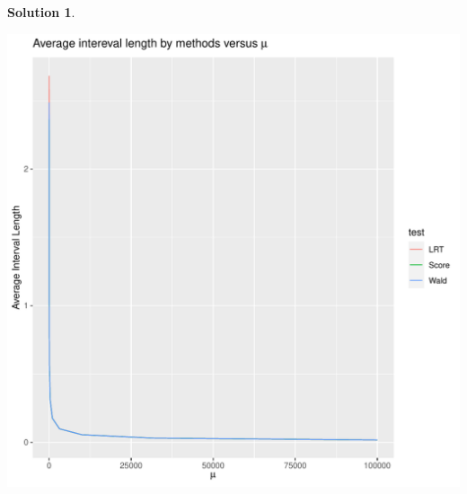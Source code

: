 \documentclass[11pt,letterpaper,english,oneside]{article}\usepackage[]{graphicx}\usepackage[]{color}
\makeatletter
\def\maxwidth{ %
  \ifdim\Gin@nat@width>\linewidth
    \linewidth
  \else
    \Gin@nat@width
  \fi
}
\newenvironment{kframe}{%
 \def\at@end@of@kframe{}%
 \ifinner\ifhmode%
  \def\at@end@of@kframe{\end{minipage}}%
  \begin{minipage}{\columnwidth}%
 \fi\fi%
 \def\FrameCommand##1{\hskip\@totalleftmargin \hskip-\fboxsep
 \colorbox{shadecolor}{##1}\hskip-\fboxsep
     \hskip-\linewidth \hskip-\@totalleftmargin \hskip\columnwidth}%
 \MakeFramed {\advance\hsize-\width
   \@totalleftmargin\z@ \linewidth\hsize
   \@setminipage}}%
 {\par\unskip\endMakeFramed%
 \at@end@of@kframe}
\newenvironment{knitrout}{}{} %
\theoremstyle{definition} %
\newtheorem{solution}{Solution}
\newenvironment{sol}{\begin{solution}\hspace{0pt}}{\end{solution}}
\makeatother
\begin{document}
\begin{sol}
\begin{enumerate}
\begin{knitrout}
\begin{kframe}
\begin{alltt}
\end{alltt}
\end{kframe}
\includegraphics[width=\maxwidth]{unnamed-chunk-5-2} 
\end{knitrout}


\end{enumerate}
\end{sol}
\end{document}
